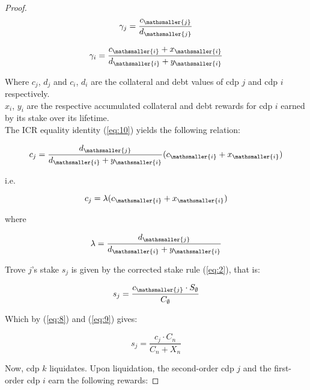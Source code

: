 \documentclass[reqno]{article}
\begin{document}
\begin{proof}
\begin{equation} 
    \gamma_j=\frac{c_\mathsmaller{j}}{d_\mathsmaller{j}}
\end{equation}

\begin{equation} 
    \gamma_i=\frac{c_\mathsmaller{i}+x_\mathsmaller{i}}{d_\mathsmaller{i}+y_\mathsmaller{i}}
\end{equation}

\bigskip
Where $c_j$, $d_j$ and $c_i$, $d_i$ are the collateral and debt values of cdp $j$ and cdp $i$ respectively.\\

$x_i$, $y_i$ are the respective accumulated collateral and debt rewards for cdp $i$ earned by its stake over its lifetime.\\

The ICR equality identity (\ref{eq:10}) yields the following relation:

\begin{equation} 
        c_j=\frac{d_\mathsmaller{j}}{d_\mathsmaller{i}+y_\mathsmaller{i}}(c_\mathsmaller{i}+x_\mathsmaller{i})
\end{equation}

\bigskip
i.e.

\begin{equation} \label{eq:14}
    c_j=\lambda(c_\mathsmaller{i}+x_\mathsmaller{i})
\end{equation}

\bigskip
where

\begin{equation} \label{eq:15}
    \lambda=\frac{d_\mathsmaller{j}}{d_\mathsmaller{i}+y_\mathsmaller{i}}
\end{equation}


\bigskip
Trove $j$’s stake $s_j$ is given by the corrected stake rule (\ref{eq:2}), that is:

\begin{equation} 
    s_j=\frac{c_\mathsmaller{j} \cdot S_\emptyset}{C_\emptyset}
\end{equation}

\bigskip
Which by (\ref{eq:8}) and (\ref{eq:9}) gives:

\begin{equation} \label{eq:17}
    s_j=\frac{c_j \cdot C_n}{C_n+X_n}
\end{equation}

\bigskip
Now, cdp $k$ liquidates. Upon liquidation, the second-order cdp $j$ and the first-order cdp $i$ earn the following rewards:


\end{proof}
\end{document}
